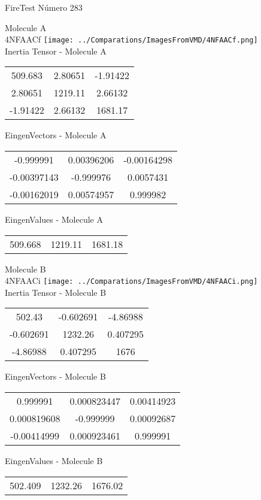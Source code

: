\vtab[-2cm]
\begin{center}
{\large FireTest \tab Número 283}
\end{center}
\begin{multicols}{2}
\begin{center}

Molecule A \\ 
4NFAACf
\texttt{[image: ../Comparations/ImagesFromVMD/4NFAACf.png]}
\\
Inertia Tensor - Molecule A \\
\vtab

\begin{tabular}{|c c c|}
509.683	 & 	2.80651	 & 	-1.91422	 \\
2.80651	 & 	1219.11	 & 	2.66132	 \\
-1.91422	 & 	2.66132	 & 	1681.17
\end{tabular}

\vtab
 EingenVectors - Molecule A     \\
\vtab
\begin{tabular}{|c c c|}
-0.999991	 & 	0.00396206	 & 	-0.00164298	 \\
-0.00397143	 & 	-0.999976	 & 	0.0057431	 \\
-0.00162019	 & 	0.00574957	 & 	0.999982
\end{tabular}

\vtab
 EingenValues - Molecule A     \\
\vtab
\begin{tabular}{|c c c|}
509.668	 & 	1219.11	 & 	1681.18	 \\
\end{tabular}
\columnbreak

Molecule B \\ 
4NFAACi
\texttt{[image: ../Comparations/ImagesFromVMD/4NFAACi.png]}
\\
Inertia Tensor - Molecule B \\
\vtab

\begin{tabular}{|c c c|}
502.43	 & 	-0.602691	 & 	-4.86988	 \\
-0.602691	 & 	1232.26	 & 	0.407295	 \\
-4.86988	 & 	0.407295	 & 	1676
\end{tabular}

\vtab
 EingenVectors - Molecule B     \\
\vtab
\begin{tabular}{|c c c|}
0.999991	 & 	0.000823447	 & 	0.00414923	 \\
0.000819608	 & 	-0.999999	 & 	0.00092687	 \\
-0.00414999	 & 	0.000923461	 & 	0.999991
\end{tabular}

\vtab
 EingenValues - Molecule B     \\
\vtab
\begin{tabular}{|c c c|}
502.409	 & 	1232.26	 & 	1676.02	 \\
\end{tabular}

\end{center}
\end{multicols}
